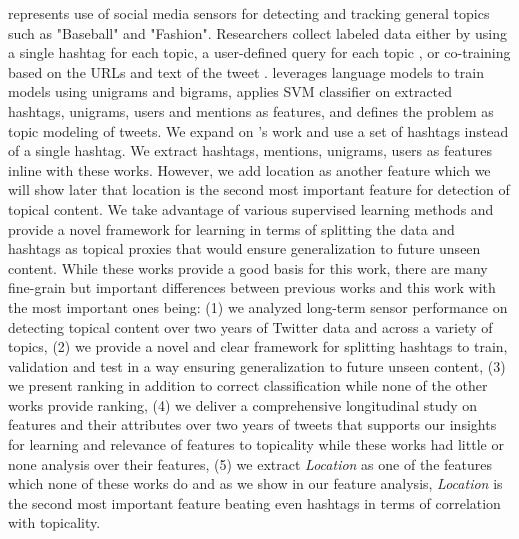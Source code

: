\vspace{2mm}
 represents use of social media sensors for detecting and tracking general topics such as "Baseball" and "Fashion". Researchers collect labeled data either by using a single hashtag for each topic\citep{lin2011smoothing}, a user-defined query for each topic \citep{magdy}, or co-training based on the URLs and text of the tweet \citep{yang2014large}. \cite{lin2011smoothing} leverages language models to train models using unigrams and bigrams, \cite{magdy} applies SVM classifier on extracted hashtags, unigrams, users and mentions as features, and \cite{yang2014large} defines the problem as topic modeling of tweets. We expand on \citep{lin2011smoothing}'s work and use a set of hashtags instead of a single hashtag. We extract hashtags, mentions, unigrams, users as features inline with these works. However, we add location as another feature which we will show later that location is the second most important feature for detection of topical content. We take advantage of various supervised learning methods and provide a novel framework for learning in terms of splitting the data and hashtags as topical proxies that would ensure generalization to future unseen content. While these works provide a good basis for this work, there are many fine-grain but important differences between previous works and this work with the most important ones being: 
(1) we analyzed long-term sensor performance on detecting topical content over two years of Twitter data and across a variety of topics, (2) we provide a novel and clear framework for splitting hashtags to train, validation and test in a way ensuring generalization to future unseen content, (3) we present ranking in addition to correct classification while none of the other works provide ranking, (4) we deliver a comprehensive longitudinal study on features and their attributes over two years of tweets that supports our insights for learning and relevance of features to topicality while these works had little or none analysis over their features, (5) we extract \textit{Location} as one of the features which none of these works do and as we show in our feature analysis, \textit{Location} is the second most important feature beating even hashtags in terms of correlation with topicality.

